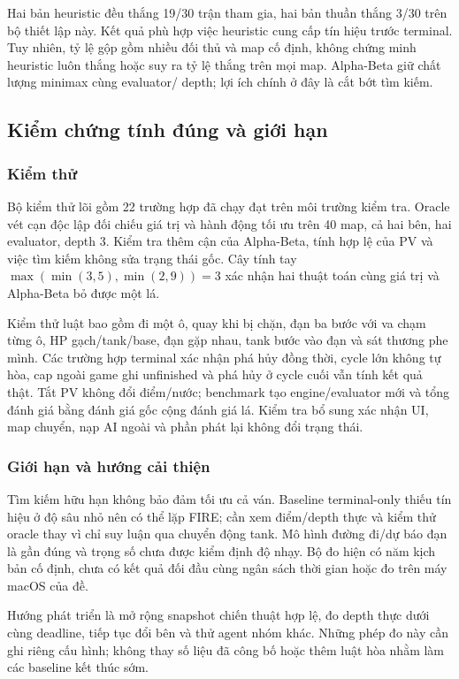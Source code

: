 Hai bản heuristic đều thắng 19/30 trận tham gia, hai bản thuần thắng
3/30 trên bộ thiết lập này. Kết quả phù hợp việc heuristic cung cấp
tín hiệu trước terminal. Tuy nhiên, tỷ lệ gộp gồm nhiều đối thủ và
map cố định, không chứng minh heuristic luôn thắng hoặc suy ra tỷ lệ
thắng trên mọi map. Alpha-Beta giữ chất lượng minimax cùng evaluator/
depth; lợi ích chính ở đây là cắt bớt tìm kiếm.

\subsection{Kiểm chứng tính đúng và giới hạn}
\subsubsection{Kiểm thử}
Bộ kiểm thử lõi gồm 22 trường hợp đã chạy đạt trên môi trường kiểm
tra. Oracle vét cạn độc lập đối chiếu giá trị và hành động tối ưu trên
40 map, cả hai bên, hai evaluator, depth 3. Kiểm tra thêm cận của
Alpha-Beta, tính hợp lệ của PV và việc tìm kiếm không sửa trạng thái
gốc. Cây tính tay $\max(\min(3,5),\min(2,9))=3$ xác nhận hai thuật
toán cùng giá trị và Alpha-Beta bỏ được một lá.

Kiểm thử luật bao gồm đi một ô, quay khi bị chặn, đạn ba bước với va
chạm từng ô, HP gạch/tank/base, đạn gặp nhau, tank bước vào đạn và sát
thương phe mình. Các trường hợp terminal xác nhận phá hủy đồng thời,
cycle lớn không tự hòa, cap ngoài game ghi unfinished và phá hủy
ở cycle cuối vẫn tính kết quả thật. Tắt PV không đổi điểm/nước;
benchmark tạo engine/evaluator mới và tổng đánh giá bằng đánh giá
gốc cộng đánh giá lá. Kiểm tra bổ sung xác nhận UI, map chuyển,
nạp AI ngoài và phần phát lại không đổi trạng thái.

\subsubsection{Giới hạn và hướng cải thiện}
Tìm kiếm hữu hạn không bảo đảm tối ưu cả ván. Baseline terminal-only
thiếu tín hiệu ở độ sâu nhỏ nên có thể lặp FIRE; cần xem điểm/depth
thực và kiểm thử oracle thay vì chỉ suy luận qua chuyển động tank.
Mô hình đường đi/dự báo đạn là gần đúng và trọng số chưa được kiểm
định độ nhạy. Bộ đo hiện có năm kịch bản cố định, chưa có kết quả
đối đầu cùng ngân sách thời gian hoặc đo trên máy macOS của đề.

Hướng phát triển là mở rộng snapshot chiến thuật hợp lệ, đo depth
thực dưới cùng deadline, tiếp tục đổi bên và thử agent nhóm khác.
Những phép đo này cần ghi riêng cấu hình; không thay số liệu đã công
bố hoặc thêm luật hòa nhằm làm các baseline kết thúc sớm.

